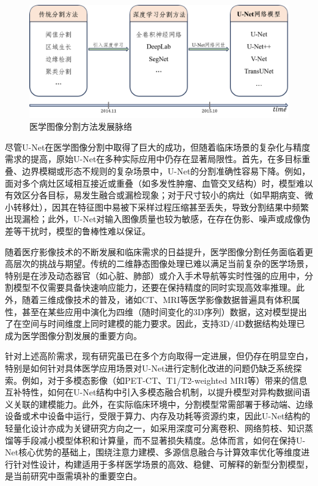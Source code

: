 \begin{figure}[h]
    \centering
    \includegraphics[width=\textwidth]{fig/develepment_of_seg.png}
    \caption{医学图像分割方法发展脉络}
    \label{develop_seg}
\end{figure}

尽管U-Net在医学图像分割中取得了巨大的成功，但随着临床场景的复杂化与精度需求的提高，原始U-Net在多种实际应用中仍存在显著局限性。首先，在多目标重叠、边界模糊或形态不规则的复杂场景中，U-Net的分割准确性容易下降。例如，面对多个病灶区域相互接近或重叠（如多发性肿瘤、血管交叉结构）时，模型难以有效区分各目标，易发生融合或漏检现象；对于尺寸较小的病灶（如早期病变、微小转移灶），因其在特征图中易被下采样过程压缩甚至丢失，导致分割结果中频繁出现漏检；此外，U-Net对输入图像质量也较为敏感，在存在伪影、噪声或成像伪差等干扰时，模型的鲁棒性难以保证\cite{azad2024}。

随着医疗影像技术的不断发展和临床需求的日益提升，医学图像分割任务面临着更高层次的挑战与期望。传统的二维静态图像处理已难以满足当前复杂的医学场景，特别是在涉及动态器官（如心脏、肺部）或介入手术导航等实时性强的应用中，分割模型不仅需要具备快速响应能力，还要在保持精度的同时实现高效率推理。此外，随着三维成像技术的普及，诸如CT、MRI等医学影像数据普遍具有体积属性，甚至在某些应用中演化为四维（随时间变化的3D序列）数据，这对模型提出了在空间与时间维度上同时建模的能力要求。因此，支持3D/4D数据结构处理已成为医学图像分割发展的重要方向。

针对上述高阶需求，现有研究虽已在多个方向取得一定进展，但仍存在明显空白，特别是如何针对具体医学应用场景对U-Net进行定制化改进的问题仍缺乏系统探索\cite{krithikaaliasanbudevi2022}。例如，对于多模态影像（如PET-CT、T1/T2-weighted MRI等）带来的信息互补特性，如何在U-Net结构中引入多模态融合机制，以提升模型对异构数据间语义关联的建模能力。此外，在实际临床环境中，分割模型常需部署于移动端、边缘设备或术中设备中运行，受限于算力、内存及功耗等资源约束，因此U-Net结构的轻量化设计亦成为关键研究方向之一，如采用深度可分离卷积、网络剪枝、知识蒸馏等手段减小模型体积和计算量，而不显著损失精度。总体而言，如何在保持U-Net核心优势的基础上，围绕注意力建模、多源信息融合与计算效率优化等维度进行针对性设计，构建适用于多样医学场景的高效、稳健、可解释的新型分割模型，是当前研究中亟需填补的重要空白。

